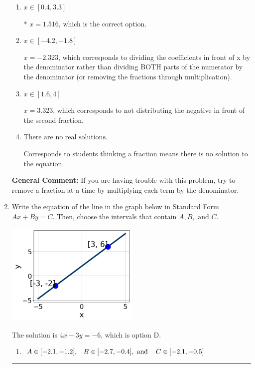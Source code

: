 \documentclass{extbook}[14pt]
\newcommand{\litem}[1]{\item #1

\rule{\textwidth}{0.4pt}}
\begin{document}
\begin{enumerate}
{\begin{enumerate}[label=\Alph*.]
 $x = -0.326$, which corresponds to dividing the second number in the numerator by the denominator rather than dividing BOTH parts of the numerator by the denominator (or removing the fractions through multiplication).
\item \( x \in [0.4, 3.3] \)

* $x = 1.516$, which is the correct option.
\item \( x \in [-4.2, -1.8] \)

 $x = -2.323$, which corresponds to dividing the coefficients in front of x by the denominator rather than dividing BOTH parts of the numerator by the denominator (or removing the fractions through multiplication).
\item \( x \in [1.6, 4] \)

 $x = 3.323$, which corresponds to not distributing the negative in front of the second fraction.
\item \( \text{There are no real solutions.} \)

Corresponds to students thinking a fraction means there is no solution to the equation.
\end{enumerate}

\textbf{General Comment:} If you are having trouble with this problem, try to remove a fraction at a time by multiplying each term by the denominator.
}
\litem{
Write the equation of the line in the graph below in Standard Form $Ax+By=C$. Then, choose the intervals that contain $A, B, \text{ and } C$.

\begin{center}
    \includegraphics[width=0.5\textwidth]{../Figures/linearGraphToStandardCopyB.png}
\end{center}


The solution is \( 4x - 3y = -6 \), which is option D.\begin{enumerate}[label=\Alph*.]
\item \( A \in [-2.1, -1.2], \hspace{3mm} B \in [-2.7, -0.4], \text{ and } \hspace{3mm} C \in [-2.1, -0.5] \)


\end{enumerate}}
\end{enumerate}
\end{document}
